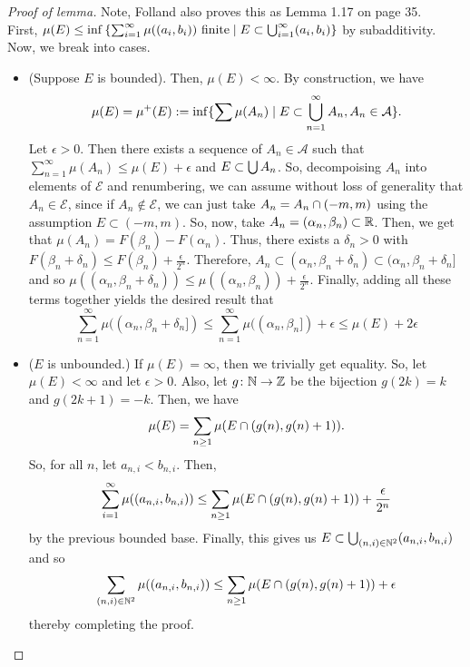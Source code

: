\documentclass[11pt,leqno,oneside]{amsbook}
\numberwithin{thm}{section}
\renewcommand{\A}{\mathcal{A}} %
\newcommand{\Ep}{\mathcal{E}} %
\begin{document}
\begin{proof}[Proof of lemma]
  Note, Folland also proves this as Lemma 1.17 on page 35.\\
  First, $\mu(E) \leq \inf \left\{ \sum_{i=1}^\infty \mu((a_i,b_i)) \text{
        finite} \mid E
      \subset \bigcup_{i=1}^\infty (a_i,b_i) \right\}$ by
    subadditivity. Now, we break into cases.
    \begin{itemize}
    \item (Suppose $E$ is bounded). Then, $\mu(E) < \infty$. By
      construction, we have \[
        \mu(E) = \mu^+(E) := \inf\{ \sum \mu(A_n) \mid E \subset
        \Union_{n=1}^\infty A_n, A_n \in \A\}.
      \]
      Let $\epsilon > 0$. Then there exists a sequence of $A_n \in \A$ such that
      $\sum_{n=1}^\infty \mu(A_n) \leq \mu(E) + \epsilon$ and \(E
      \subset \bigcup A_n\). So,
      decompoising $A_n$ into elements of $\Ep$ and renumbering, we
      can assume without loss of generality that $A_n \in \Ep$, since
      if $A_n \not \in \Ep$, we can just take $A_n = A_n \cap
      (-m,m)$ using the assumption $E \subset (-m,m)$. So, now, take $A_n = (\alpha_n,
      \beta_n) \subset {\mathbb R}$. Then, we get that $\mu(A_n) = F(\beta_n) -
      F(\alpha_n)$. Thus, there exists a $\delta_n > 0$ with
      $F(\beta_n + \delta_n) \leq F(\beta_n) +
      \frac{\epsilon}{2^n}$. Therefore, $A_n \subset
      (\alpha_n, \beta_n + \delta_n) \subset (\alpha_n, \beta_n +
      \delta_n]$ and so $\mu((\alpha_n,\beta_n+\delta_n)) \leq
      \mu((\alpha_n,\beta_n)) + \frac{\epsilon}{2^n}$. Finally, adding
      all these terms together 
      yields the desired result that \[
        \sum_{n=1}^\infty \mu((\alpha_n,\beta_n+\delta_n]) \leq
        \sum_{n=1}^\infty \mu((\alpha_n,\beta_n]) + \epsilon \leq
        \mu(E) + 2 \epsilon
      \]
    \item ($E$ is unbounded.) If $\mu(E) = \infty$, then we trivially
      get equality. So, let $\mu(E) < \infty$ and let $\epsilon >
      0$. Also, let $g \colon {\mathbb N} \to {\mathbb Z}$ be the bijection $g(2k) = k$
      and $g(2k+1) = -k$. Then, we have \[
        \mu(E) = \sum_{n \geq 1} \mu(E \cap (g(n),g(n)+1)).
      \]
      So, for all $n$, let $a_{n,i} < b_{n,i}$. Then, \[
        \sum_{i=1}^\infty \mu((a_{n,i},b_{n,i})) \leq \sum_{n \geq 1}
        \mu(E \cap (g(n),g(n)+1)) + \frac{\epsilon}{2^n}
      \]
      by the previous bounded base. Finally, this gives us $E \subset
      \bigcup_{(n,i) \in {\mathbb N}^2} (a_{n,i},b_{n,i})$ and so \[
        \sum_{(n,i) \in {\mathbb N}^2} \mu((a_{n,i},b_{n,i})) \leq \sum_{n \geq
        1} \mu(E
        \cap (g(n),g(n)+1)) + \epsilon
      \]
      thereby completing the proof.
    \end{itemize}
  \end{proof}
\end{document}
